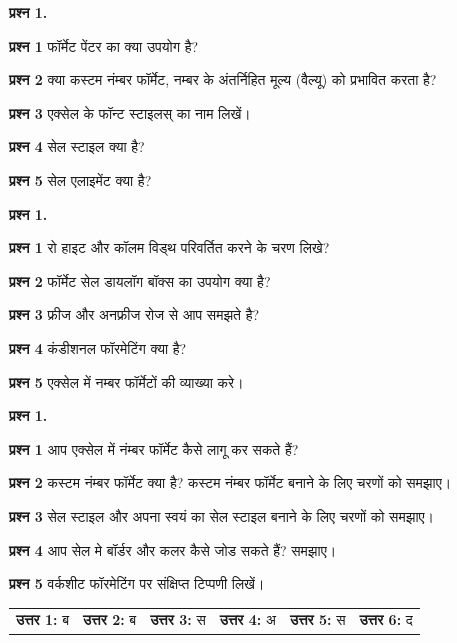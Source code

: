 \begin{descriptionSimple}{\textbf{प्रश्न 1.}}
\item[\textbf{प्रश्न 1}] फॉर्मेट पेंटर का क्या उपयोग है?
\item[\textbf{प्रश्न 2}] क्या कस्टम नंम्बर फॉर्मेट, नम्बर के अंतर्निहित मूल्य (वैल्यू) को प्रभावित करता है?
\item[\textbf{प्रश्न 3}] एक्सेल के फॉन्ट स्टाइलस् का नाम लिखें।
\item[\textbf{प्रश्न 4}] सेल स्टाइल क्या है?
\item[\textbf{प्रश्न 5}] सेल एलाइमेंट क्या है?
\end{descriptionSimple}

\begin{descriptionSimple}{\textbf{प्रश्न 1.}}
\item[\textbf{प्रश्न 1}] रो हाइट और कॉलम विड्थ परिवर्तित करने के चरण लिखे?
\item[\textbf{प्रश्न 2}] फॉर्मेट सेल डायलॉग बॉक्स का उपयोग क्या है?
\item[\textbf{प्रश्न 3}] फ्रीज और अनफ्रीज रोज से आप समझते है?
\item[\textbf{प्रश्न 4}] कंडीशनल फॉरमेटिंग क्या है?
\item[\textbf{प्रश्न 5}] एक्सेल में नम्बर फॉर्मेटों की व्याख्या करे।
\end{descriptionSimple}

\begin{descriptionSimple}{\textbf{प्रश्न 1.}}
\item[\textbf{प्रश्न 1}] आप एक्सेल में नंम्बर फॉर्मेट कैसे लागू कर सकते हैं?
\item[\textbf{प्रश्न 2}] कस्टम नंम्बर फॉर्मेट क्या है? कस्टम नंम्बर फॉर्मेट बनाने के लिए चरणों को समझाए।
\item[\textbf{प्रश्न 3}] सेल स्टाइल और अपना स्वयं का सेल स्टाइल बनाने के लिए चरणों को समझाए।
\item[\textbf{प्रश्न 4}] आप सेल मे बॉर्डर और कलर कैसे जोड सकते हैं? समझाए।
\item[\textbf{प्रश्न 5}] वर्कशीट फॉरमेटिंग पर संक्षिप्त टिप्पणी लिखें।
\end{descriptionSimple}


\begin{tabular}{@{}llllll}
\textbf{उत्तर 1:} ब &
\textbf{उत्तर 2:} ब &
\textbf{उत्तर 3:} स &
\textbf{उत्तर 4:} अ &
\textbf{उत्तर 5:} स &
\textbf{उत्तर 6:} द
\end{tabular}

